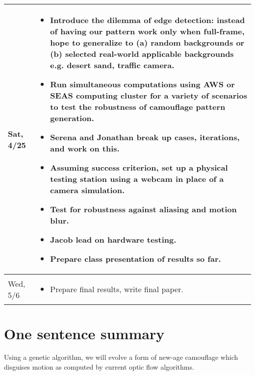 \documentclass[11pt,letter]{article}
\begin{document}
\begin{table}[h]
\begin{tabular}{|p{} | p{}|}
Sat, 4/25 &\begin{itemize} \item Introduce the dilemma of edge detection: instead of having our pattern work only when full-frame, hope to generalize to (a) random backgrounds or (b) selected real-world applicable backgrounds e.g. desert sand, traffic camera. \item Run simultaneous computations using AWS or SEAS computing cluster for a variety of scenarios to test the robustness of camouflage pattern generation. \item Serena and Jonathan break up cases, iterations, and work on this. \item Assuming success criterion, set up a physical testing station using a webcam in place of a camera simulation. \item Test for robustness against aliasing and motion blur. \item Jacob lead on hardware testing.  \item Prepare class presentation of results so far.       \end{itemize}                                                  \\ \hline
Wed, 5/6  & \begin{itemize} \item Prepare final results, write final paper.                                                                                                                                                                                                                                                                                                                                                                                                                                                                                                                                                                                                                                                                                                                                                                                           \end{itemize}  \\ \hline
\end{tabular}
\end{table}

\section{One sentence summary} 

Using a genetic algorithm, we will evolve a form of new-age camouflage which disguises motion as computed by current optic flow algorithms. 

\thebibliography{}
\end{document}
